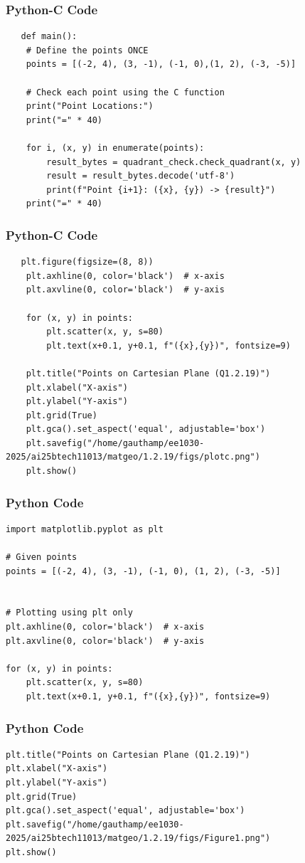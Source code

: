 \documentclass{beamer}
\begin{document}
\begin{frame}[fragile]
\frametitle{Python-C Code}
   \begin{lstlisting}
   def main():
    # Define the points ONCE
    points = [(-2, 4), (3, -1), (-1, 0),(1, 2), (-3, -5)]
    
    # Check each point using the C function
    print("Point Locations:")
    print("=" * 40)
    
    for i, (x, y) in enumerate(points):
        result_bytes = quadrant_check.check_quadrant(x, y)
        result = result_bytes.decode('utf-8')
        print(f"Point {i+1}: ({x}, {y}) -> {result}")
    print("=" * 40)
   \end{lstlisting}
\end{frame}
\begin{frame}[fragile]
\frametitle{Python-C Code}
   \begin{lstlisting}
   plt.figure(figsize=(8, 8))
    plt.axhline(0, color='black')  # x-axis
    plt.axvline(0, color='black')  # y-axis

    for (x, y) in points:
        plt.scatter(x, y, s=80)
        plt.text(x+0.1, y+0.1, f"({x},{y})", fontsize=9)

    plt.title("Points on Cartesian Plane (Q1.2.19)")
    plt.xlabel("X-axis")
    plt.ylabel("Y-axis")
    plt.grid(True)
    plt.gca().set_aspect('equal', adjustable='box')
    plt.savefig("/home/gauthamp/ee1030-2025/ai25btech11013/matgeo/1.2.19/figs/plotc.png")
    plt.show()

   \end{lstlisting}
\end{frame}
\begin{frame}[fragile]
\frametitle{Python Code}
   \begin{lstlisting}
import matplotlib.pyplot as plt

# Given points
points = [(-2, 4), (3, -1), (-1, 0), (1, 2), (-3, -5)]


# Plotting using plt only
plt.axhline(0, color='black')  # x-axis
plt.axvline(0, color='black')  # y-axis

for (x, y) in points:
    plt.scatter(x, y, s=80)
    plt.text(x+0.1, y+0.1, f"({x},{y})", fontsize=9)
\end{lstlisting}
\end{frame}
\begin{frame}[fragile]
\frametitle{Python Code}
   \begin{lstlisting}
plt.title("Points on Cartesian Plane (Q1.2.19)")
plt.xlabel("X-axis")
plt.ylabel("Y-axis")
plt.grid(True)
plt.gca().set_aspect('equal', adjustable='box')
plt.savefig("/home/gauthamp/ee1030-2025/ai25btech11013/matgeo/1.2.19/figs/Figure1.png")
plt.show()
\end{lstlisting}
\end{frame}
\end{document}

